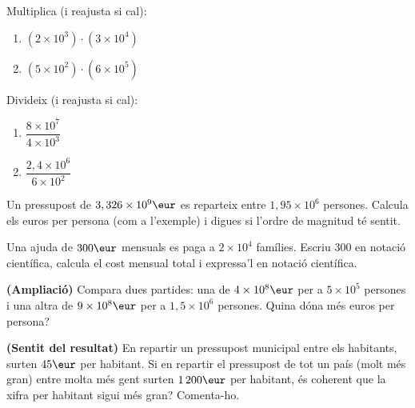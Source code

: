 \begin{exercicis}
\begin{exlist}
  \item Multiplica (i reajusta si cal):
        \begin{enumerate}[label=\alph*), leftmargin=1.6em, topsep=2pt]
          \item $(2\times 10^{3})\cdot(3\times 10^{4})$
          \item $(5\times 10^{2})\cdot(6\times 10^{5})$
        \end{enumerate}
  \item Divideix (i reajusta si cal):
        \begin{enumerate}[label=\alph*), leftmargin=1.6em, topsep=2pt]
          \item $\dfrac{8\times 10^{7}}{4\times 10^{3}}$
          \item $\dfrac{2,4\times 10^{6}}{6\times 10^{2}}$
        \end{enumerate}
  \item Un pressupost de $3,326\times 10^{9}\eur$ es reparteix entre $1,95\times 10^{6}$
        persones. Calcula els euros per persona (com a l'exemple) i digues si l'ordre
        de magnitud té sentit.
  \item Una ajuda de $300\eur$ mensuals es paga a $2\times 10^{4}$ famílies. Escriu
        $300$ en notació científica, calcula el cost mensual total i expressa'l en
        notació científica.
  \item \textbf{(Ampliació)} Compara dues partides: una de $4\times 10^{8}\eur$ per a
        $5\times 10^{5}$ persones i una altra de $9\times 10^{8}\eur$ per a
        $1,5\times 10^{6}$ persones. Quina dóna més euros per persona?
  \item \textbf{(Sentit del resultat)} En repartir un pressupost municipal entre els
        habitants, surten $45\eur$ per habitant. Si en repartir el pressupost de tot un
        país (molt més gran) entre molta més gent surten $1\,200\eur$ per habitant,
        és coherent que la xifra per habitant sigui més gran? Comenta-ho.
\end{exlist}
\end{exercicis}

